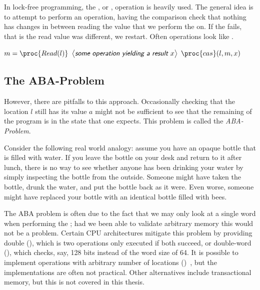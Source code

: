 In lock-free programming, the , or , operation is heavily used.
The general idea is to attempt to perform an operation, having the comparison check that nothing
has changes in between reading the value that we perform the  on. If the 
fails, that is the read value was different, we restart. Often operations look like
.

\begin{codebox}
\li \While \Then
\li $m = \proc{Read(l)}$
\li $\lit{some operation yielding a result $x$}$
\li \If $\proc{cas}(l, m, x)$ \Then
\li \Return
\End \End
\end{codebox}

\subsection{The ABA-Problem\label{sec:aba-problem}}

However, there are pitfalls to this approach. Occasionally checking that the location $l$ still has
its value $a$ might not be sufficient to see that the remaining of the program is in the state that
one expects. This problem is called the \emph{ABA-Problem}.

Consider the following real world analogy: assume you have an opaque bottle that is filled with
water. If you leave the bottle on your desk and return to it after lunch, there is no way to see
whether anyone has been drinking your water by simply inspecting the bottle from the outside.
Someone might have taken the bottle, drunk the water, and put the bottle back as it were. Even
worse, someone might have replaced your bottle with an identical bottle filled with bees.

The ABA problem is often due to the fact that we may only look at a single word when performing the
; had we been able to validate arbitrary memory this would not be a problem. Certain CPU
architectures mitigate this problem by providing double  (), which
is two  operations only executed if both succeed, or double-word 
(), which checks, say, 128 bits instead of the word size of 64.  It is possible to
implement  operations with arbitrary number of locations
()~\cite{harris2002practical,luchangco2003nonblocking}, but the implementations are often
not practical. Other alternatives include transactional memory, but this is not covered in this
thesis.


